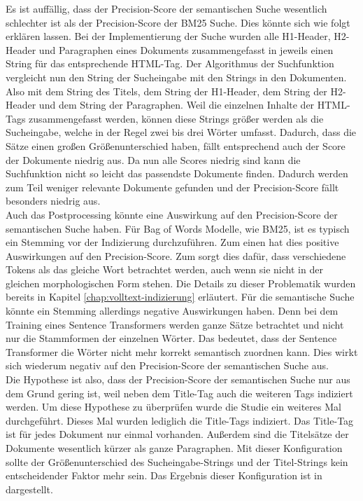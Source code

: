 Es ist auffällig, dass der Precision-Score der semantischen Suche wesentlich schlechter ist als der Precision-Score der BM25 Suche.
Dies könnte sich wie folgt erklären lassen.
Bei der Implementierung der Suche wurden alle H1-Header, H2-Header und Paragraphen eines Dokuments zusammengefasst in jeweils einen String für das entsprechende HTML-Tag.
Der Algorithmus der Suchfunktion vergleicht nun den String der Sucheingabe mit den Strings in den Dokumenten.
Also mit dem String des Titels, dem String der H1-Header, dem String der H2-Header und dem String der Paragraphen.
Weil die einzelnen Inhalte der HTML-Tags zusammengefasst werden, können diese Strings größer werden als die Sucheingabe, welche in der Regel zwei bis drei Wörter umfasst.
Dadurch, dass die Sätze einen großen Größenunterschied haben, fällt entsprechend auch der Score der Dokumente niedrig aus.
Da nun alle Scores niedrig sind kann die Suchfunktion nicht so leicht das passendste Dokumente finden.
Dadurch werden zum Teil weniger relevante Dokumente gefunden und der Precision-Score fällt besonders niedrig aus.\\

Auch das Postprocessing könnte eine Auswirkung auf den Precision-Score der semantischen Suche haben.
Für Bag of Words Modelle, wie BM25, ist es typisch ein Stemming vor der Indizierung durchzuführen.
Zum einen hat dies positive Auswirkungen auf den Precision-Score.
Zum sorgt dies dafür, dass verschiedene Tokens als das gleiche Wort betrachtet werden, auch wenn sie nicht in der gleichen morphologischen Form stehen.
Die Details zu dieser Problematik wurden bereits in Kapitel \ref{chap:volltext-indizierung} erläutert.
Für die semantische Suche könnte ein Stemming allerdings negative Auswirkungen haben.
Denn bei dem Training eines Sentence Transformers werden ganze Sätze betrachtet und nicht nur die Stammformen der einzelnen Wörter.
Das bedeutet, dass der Sentence Transformer die Wörter nicht mehr korrekt semantisch zuordnen kann.
Dies wirkt sich wiederum negativ auf den Precision-Score der semantischen Suche aus.\\

Die Hypothese ist also, dass der Precision-Score der semantischen Suche nur aus dem Grund gering ist, weil neben dem Title-Tag auch die weiteren Tags indiziert werden.
Um diese Hypothese zu überprüfen wurde die Studie ein weiteres Mal durchgeführt.
Dieses Mal wurden lediglich die Title-Tags indiziert.
Das Title-Tag ist für jedes Dokument nur einmal vorhanden.
Außerdem sind die Titelsätze der Dokumente wesentlich kürzer als ganze Paragraphen.
Mit dieser Konfiguration sollte der Größenunterschied des Sucheingabe-Strings und der Titel-Strings kein entscheidender Faktor mehr sein.
Das Ergebnis dieser Konfiguration ist in  dargestellt.\\

